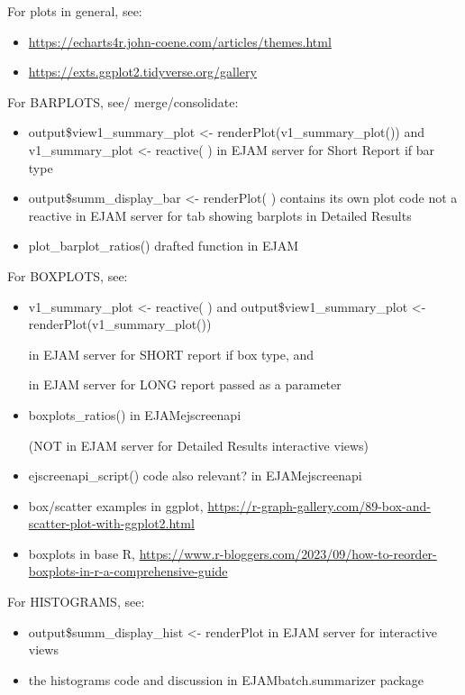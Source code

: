 \documentclass[a4paper]{book}
\begin{document}
%
\begin{Details}\relax
For plots in general, see:
\begin{itemize}

\item{} \url{https://echarts4r.john-coene.com/articles/themes.html}
\item{} \url{https://exts.ggplot2.tidyverse.org/gallery}

\end{itemize}


For BARPLOTS, see/ merge/consolidate:
\begin{itemize}

\item{} output\$view1\_summary\_plot <- renderPlot(v1\_summary\_plot()) and v1\_summary\_plot <- reactive( )
in EJAM server for Short Report if  bar type
\item{} output\$summ\_display\_bar <- renderPlot(  ) contains its own plot code not a reactive
in EJAM server for tab showing barplots in Detailed Results
\item{} plot\_barplot\_ratios() drafted function in EJAM

\end{itemize}


For BOXPLOTS, see:
\begin{itemize}

\item{} v1\_summary\_plot <- reactive( )     and output\$view1\_summary\_plot <- renderPlot(v1\_summary\_plot())

in EJAM server for SHORT report if box type, and

in EJAM server for LONG report passed as a parameter
\item{} boxplots\_ratios()   in EJAMejscreenapi

(NOT in EJAM server for Detailed Results interactive views)
\item{} ejscreenapi\_script() code also relevant? in EJAMejscreenapi
\item{} box/scatter examples in ggplot, \url{https://r-graph-gallery.com/89-box-and-scatter-plot-with-ggplot2.html}
\item{} boxplots in base R, \url{https://www.r-bloggers.com/2023/09/how-to-reorder-boxplots-in-r-a-comprehensive-guide}

\end{itemize}


For HISTOGRAMS, see:
\begin{itemize}

\item{} output\$summ\_display\_hist <- renderPlot   in EJAM server for interactive views
\item{} the histograms code and discussion in EJAMbatch.summarizer package

\end{itemize}

\end{Details}
\end{document}
